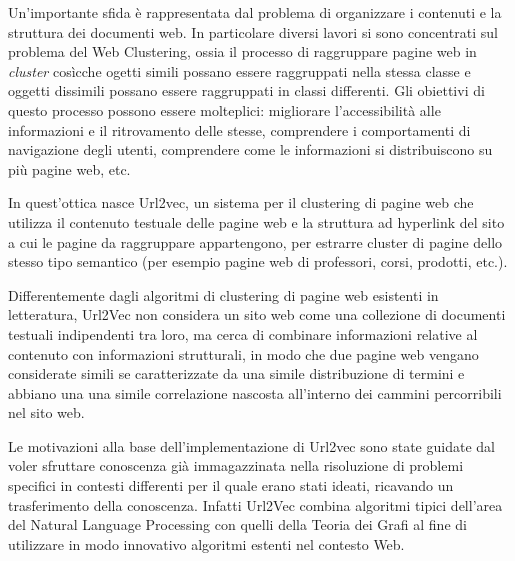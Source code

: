 Un'importante sfida è rappresentata dal problema di organizzare i contenuti e la struttura dei documenti web.
In particolare diversi lavori si sono concentrati sul problema del Web Clustering, ossia il processo di raggruppare pagine web in \textit{cluster} cosìcche ogetti simili  possano essere raggruppati nella stessa classe e oggetti dissimili possano essere raggruppati in classi differenti.
Gli obiettivi di questo processo possono essere molteplici: migliorare l'accessibilità alle informazioni e il ritrovamento delle stesse, comprendere i comportamenti di navigazione degli utenti, comprendere come le informazioni si distribuiscono su più pagine web, etc.

In quest'ottica nasce Url2vec, un sistema per il clustering di pagine web che utilizza il contenuto testuale delle pagine web e la struttura ad hyperlink del sito a cui le pagine da raggruppare appartengono, per estrarre cluster di pagine dello stesso tipo semantico (per esempio pagine web di professori, corsi, prodotti, etc.).

Differentemente dagli algoritmi di clustering di pagine web esistenti in letteratura, Url2Vec non considera un sito web come una collezione di documenti testuali indipendenti tra loro, ma cerca di combinare informazioni relative al contenuto con informazioni strutturali, in modo che due pagine web vengano considerate simili se  caratterizzate da una simile distribuzione di termini e abbiano una una simile correlazione nascosta all'interno dei cammini percorribili nel sito web.
 

Le motivazioni alla base dell'implementazione di Url2vec sono state guidate dal voler sfruttare conoscenza già immagazzinata nella risoluzione di problemi specifici in contesti differenti per il quale erano stati ideati, ricavando un trasferimento della conoscenza.
Infatti Url2Vec combina algoritmi tipici dell'area del Natural Language Processing con quelli della Teoria dei Grafi al fine di utilizzare in modo innovativo algoritmi estenti nel contesto Web. 

